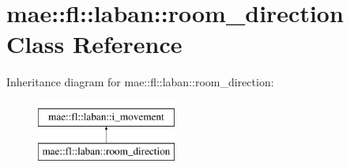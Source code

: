 \hypertarget{classmae_1_1fl_1_1laban_1_1room__direction}{\section{mae\-:\-:fl\-:\-:laban\-:\-:room\-\_\-direction Class Reference}
\label{classmae_1_1fl_1_1laban_1_1room__direction}
}
Inheritance diagram for mae\-:\-:fl\-:\-:laban\-:\-:room\-\_\-direction\-:\begin{figure}[H]
\begin{center}
\leavevmode
\includegraphics[height=2.000000cm]{classmae_1_1fl_1_1laban_1_1room__direction}
\end{center}
\end{figure}
